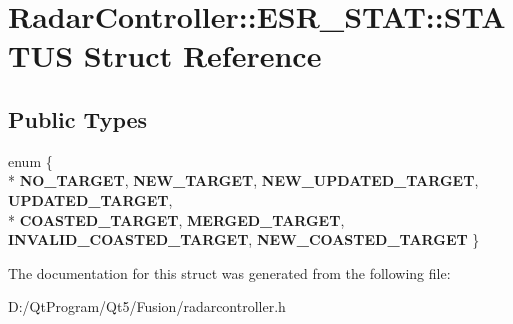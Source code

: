 \hypertarget{struct_radar_controller_1_1_e_s_r___s_t_a_t_1_1_s_t_a_t_u_s}{}\section{Radar\+Controller\+:\+:E\+S\+R\+\_\+\+S\+T\+A\+T\+:\+:S\+T\+A\+T\+U\+S Struct Reference}
\label{struct_radar_controller_1_1_e_s_r___s_t_a_t_1_1_s_t_a_t_u_s}
\subsection*{Public Types}
\begin{DoxyCompactItemize}
\item 
\hypertarget{struct_radar_controller_1_1_e_s_r___s_t_a_t_1_1_s_t_a_t_u_s_ae1c4cdbe374b603dc1869f3b588cac01}{}enum \{ \\*
{\bfseries N\+O\+\_\+\+T\+A\+R\+G\+E\+T}, 
{\bfseries N\+E\+W\+\_\+\+T\+A\+R\+G\+E\+T}, 
{\bfseries N\+E\+W\+\_\+\+U\+P\+D\+A\+T\+E\+D\+\_\+\+T\+A\+R\+G\+E\+T}, 
{\bfseries U\+P\+D\+A\+T\+E\+D\+\_\+\+T\+A\+R\+G\+E\+T}, 
\\*
{\bfseries C\+O\+A\+S\+T\+E\+D\+\_\+\+T\+A\+R\+G\+E\+T}, 
{\bfseries M\+E\+R\+G\+E\+D\+\_\+\+T\+A\+R\+G\+E\+T}, 
{\bfseries I\+N\+V\+A\+L\+I\+D\+\_\+\+C\+O\+A\+S\+T\+E\+D\+\_\+\+T\+A\+R\+G\+E\+T}, 
{\bfseries N\+E\+W\+\_\+\+C\+O\+A\+S\+T\+E\+D\+\_\+\+T\+A\+R\+G\+E\+T}
 \}\label{struct_radar_controller_1_1_e_s_r___s_t_a_t_1_1_s_t_a_t_u_s_ae1c4cdbe374b603dc1869f3b588cac01}

\end{DoxyCompactItemize}


The documentation for this struct was generated from the following file\+:\begin{DoxyCompactItemize}
\item 
D\+:/\+Qt\+Program/\+Qt5/\+Fusion/radarcontroller.\+h\end{DoxyCompactItemize}
